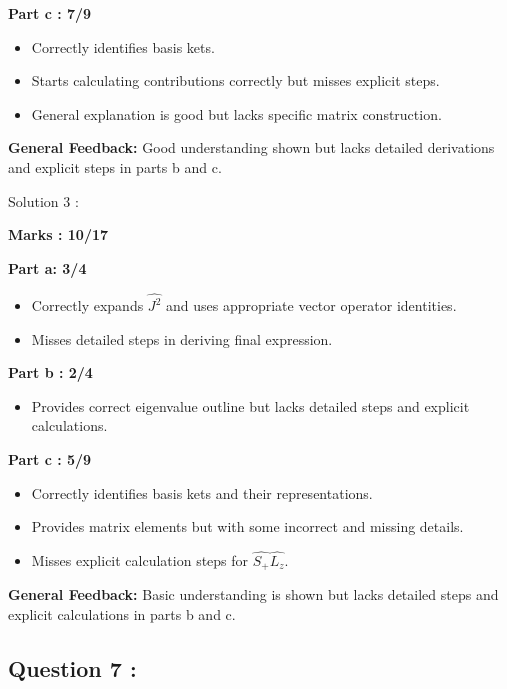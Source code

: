 \documentclass[a4paper,11pt]{article}
\begin{document}
\textbf{Part c : 7/9}
\begin{itemize}
    \item Correctly identifies basis kets.
    \item Starts calculating contributions correctly but misses explicit steps.
    \item General explanation is good but lacks specific matrix construction.
\end{itemize}

\textbf{General Feedback:}
Good understanding shown but lacks detailed derivations and explicit steps in parts b and c.



Solution 3 :

\textbf{Marks : 10/17}

\textbf{Part a: 3/4}
\begin{itemize}
    \item Correctly expands $\hat{J^2}$ and uses appropriate vector operator identities.
    \item Misses detailed steps in deriving final expression.
\end{itemize}



\textbf{Part b : 2/4}
\begin{itemize}
    \item Provides correct eigenvalue outline but lacks detailed steps and explicit calculations.
\end{itemize}



\textbf{Part c : 5/9}
\begin{itemize}
    \item Correctly identifies basis kets and their representations.
    \item Provides matrix elements but with some incorrect and missing details.
    \item Misses explicit calculation steps for $\hat{S_+}\hat{L_z}$.
\end{itemize}

\textbf{General Feedback:}
Basic understanding is shown but lacks detailed steps and explicit calculations in parts b and c.





\subsection*{Question 7 : }
\end{document}
